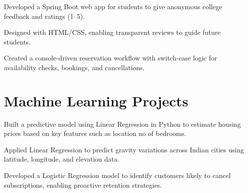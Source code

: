 \documentclass[]{deedy-resume-openfont}
\begin{document}
\begin{minipage}[t]{0.66\textwidth}
\begin{tightemize}
  \item Developed a Spring Boot web app for students to give anonymous college feedback and ratings (1–5).
  \item Designed with HTML/CSS, enabling transparent reviews to guide future students.
\end{tightemize}

\begin{tightemize}
  \item Created a console-driven reservation workflow with switch-case logic for availability checks, bookings, and cancellations.
\end{tightemize}
\sectionsep

\section{Machine Learning Projects}
\begin{tightemize}
  \item Built a predictive model using Linear Regression in Python to estimate housing prices based on key features such as location no of bedrooms.
\end{tightemize}

\begin{tightemize}
  \item  Applied Linear Regression to predict gravity variations across Indian cities using latitude, longitude, and elevation data.
\end{tightemize}

\begin{tightemize}
  \item Developed a Logistic Regression model to identify customers likely to cancel subscriptions, enabling proactive retention strategies.
\end{tightemize}

\nocite{*}

\end{minipage} 
\end{document}
